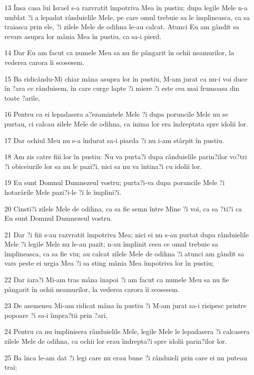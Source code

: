 \par 13 Însa casa lui Israel s-a razvratit împotriva Mea în pustiu; dupa legile Mele n-a umblat ?i a lepadat rânduielile Mele, pe care omul trebuie sa le împlineasca, ca sa traiasca prin ele, ?i zilele Mele de odihna le-au calcat. Atunci Eu am gândit sa revars asupra lor mânia Mea în pustiu, ca sa-i pierd.
\par 14 Dar Eu am facut ca numele Meu sa nu fie pângarit în ochii neamurilor, la vederea carora îi scosesem.
\par 15 Ba ridicându-Mi chiar mâna asupra lor în pustiu, M-am jurat ca nu-i voi duce în ?ara ce rânduisem, în care curge lapte ?i miere ?i este cea mai frumoasa din toate ?arile,
\par 16 Pentru ca ei lepadasera a?ezamintele Mele ?i dupa poruncile Mele nu se purtau, ci calcau zilele Mele de odihna, ca inima lor era îndreptata spre idolii lor.
\par 17 Dar ochiul Meu nu s-a îndurat sa-i piarda ?i nu i-am stârpit în pustiu.
\par 18 Am zis catre fiii lor în pustiu: Nu va purta?i dupa rânduielile parin?ilor vo?tri ?i obiceiurile lor sa nu le pazi?i, nici sa nu va întina?i cu idolii lor.
\par 19 Eu sunt Domnul Dumnezeul vostru; purta?i-va dupa poruncile Mele ?i hotarârile Mele pazi?i-le ?i le împlini?i.
\par 20 Cinsti?i zilele Mele de odihna, ca sa fie semn între Mine ?i voi, ca sa ?ti?i ca Eu sunt Domnul Dumnezeul vostru.
\par 21 Dar ?i fiii s-au razvratit împotriva Mea; nici ei nu s-au purtat dupa rânduielile Mele ?i legile Mele nu le-au pazit; n-au împlinit ceea ce omul trebuie sa împlineasca, ca sa fie viu; au calcat zilele Mele de odihna ?i atunci am gândit sa vars peste ei urgia Mea ?i sa sting mânia Mea împotriva lor în pustiu;
\par 22 Dar iara?i Mi-am tras mâna înapoi ?i am facut ca numele Meu sa nu fie pângarit în ochii neamurilor, la vederea carora îi scosesem.
\par 23 De asemenea Mi-am ridicat mâna în pustiu ?i M-am jurat sa-i risipesc printre popoare ?i sa-i împra?tii prin ?ari,
\par 24 Pentru ca nu împlinisera rânduielile Mele, legile Mele le lepadasera ?i calcasera zilele Mele de odihna, ca ochii lor erau îndrepta?i spre idolii parin?ilor lor.
\par 25 Ba înca le-am dat ?i legi care nu erau bune ?i rânduieli prin care ei nu puteau trai;
